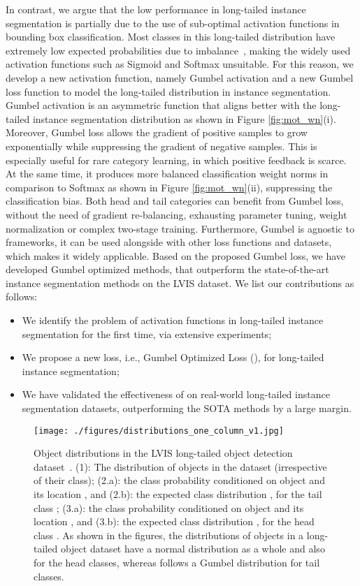 \documentclass[runningheads]{llncs}
\begin{document}
In contrast, we argue that the low performance in long-tailed instance segmentation is partially due to the use of sub-optimal activation functions in bounding box classification. Most classes in this long-tailed distribution have extremely low expected probabilities due to imbalance~\cite{oksuz2020imbalance}, making the widely used activation functions such as Sigmoid and Softmax unsuitable.
For this reason, we develop a new activation function, namely Gumbel activation and a new Gumbel loss function to model the long-tailed distribution in instance segmentation. Gumbel activation is an asymmetric function that aligns better with the long-tailed instance segmentation distribution as shown in Figure \ref{fig:mot_wn}(i). Moreover, Gumbel loss allows the gradient of positive samples to grow exponentially while suppressing the gradient of negative samples. This is especially useful for rare category learning, in which positive feedback is scarce. At the same time, it produces more balanced classification weight norms in comparison to Softmax as shown in Figure \ref{fig:mot_wn}(ii), suppressing the classification bias. Both head and tail categories can benefit from Gumbel loss, without the need of gradient re-balancing, exhausting parameter tuning, weight normalization or complex two-stage training. Furthermore, Gumbel is agnostic to frameworks, it can be used alongside with other loss functions and datasets, which makes it widely applicable.
Based on the proposed Gumbel loss, we have developed Gumbel optimized methods, that outperform the state-of-the-art instance segmentation methods on the LVIS \cite{gupta2019lvis} dataset. We list our contributions as follows:
\begin{itemize}
    \item We identify the problem of activation functions in long-tailed instance segmentation for the first time, via extensive experiments;
    \item We propose a new loss, i.e., Gumbel Optimized Loss (), for long-tailed instance segmentation;
    \item We have validated the effectiveness of  on real-world long-tailed instance segmentation datasets, outperforming the SOTA methods by a large margin.
\end{itemize}
\begin{figure*}[t]
    \centering
    \texttt{[image: ./figures/distributions\_one\_column\_v1.jpg]}
    \caption{Object distributions in the LVIS long-tailed object detection dataset~\cite{gupta2019lvis}. (1): The distribution of objects  in the dataset (irrespective of their class); (2.a): the class probability conditioned on object and its location , and (2.b): the expected class distribution , for the tail class ;
    (3.a): the class probability conditioned on object and its location , and (3.b): the expected class distribution , for the head class . As shown in the figures, the distributions of objects in a long-tailed object dataset have a normal distribution as a whole and also for the head classes, whereas follows a Gumbel distribution for tail classes.}
\label{fig:obj_det_distribution}
\end{figure*}
\end{document}
